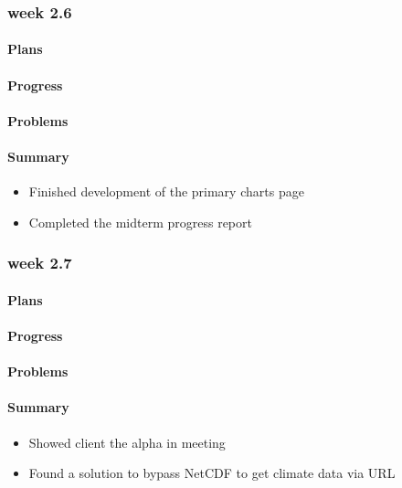 \documentclass[onecolumn, draftclsnofoot,10pt, compsoc]{article}
\begin{document}
		\subsubsection{week 2.6}
			\paragraph{Plans} \hfill \break

			\paragraph{Progress} \hfill \break

			\paragraph{Problems} \hfill \break

			\paragraph{Summary} \hfill \break
				\begin{itemize}
                    \item Finished development of the primary charts page
                    \item Completed the midterm progress report
                \end{itemize}

		\subsubsection{week 2.7}
			\paragraph{Plans} \hfill \break
		    \paragraph{Progress} \hfill \break
			\paragraph{Problems} \hfill \break
			\paragraph{Summary} \hfill \break
				\begin{itemize}
                    \item Showed client the alpha in meeting
                    \item Found a solution to bypass NetCDF to get climate data via URL
                \end{itemize}
\end{document}
